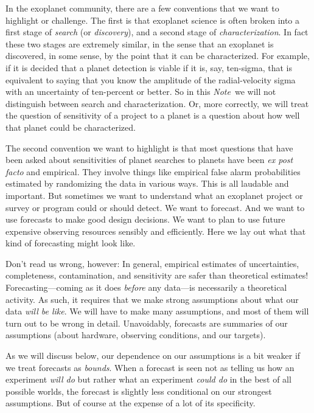 \documentclass[10pt, letterpaper]{article}
\newcommand{\documentname}{\textsl{Note}}
\newcommand{\foreign}[1]{\textsl{#1}}
\newcounter{marginnote}
\renewcommand{\footnote}[1]{\refstepcounter{marginnote}\textsuperscript{\themarginnote}\marginpar{\color{darkgray}\raggedright\footnotesize\textsuperscript{\themarginnote}#1}}
\begin{document}
In the exoplanet community, there are a few conventions that we want
to highlight or challenge.
The first is that exoplanet science is often broken into a first stage
of \textsl{search} (or \textsl{discovery}), and a second stage of
\textsl{characterization}.
In fact these two stages are extremely similar, in the sense that an
exoplanet is discovered, in some sense, by the point that it can be
characterized.
For example, if it is decided that a planet detection is viable if it is,
say, ten-sigma, that is equivalent to saying that you know the amplitude
of the radial-velocity sigma with an uncertainty of ten-percent or better.
So in this \documentname\ we will not distinguish between search and
characterization.
Or, more correctly, we will treat the question of sensitivity of a
project to a planet is a question about how well that planet could be
characterized.

The second convention we want to highlight is that most questions that
have been asked about sensitivities of planet searches to planets have
been \foreign{ex post facto} and empirical.
They involve things like empirical false alarm
probabilities\footnote{MB WHAT TO CITE?}  estimated by randomizing the
data in various ways.
This is all laudable and important.
But sometimes we want to understand what an exoplanet project or survey
or program could or should detect. We want to forecast. And we want to use
forecasts to make good design decisions. We want to plan to use future
expensive observing resources sensibly and efficiently.
Here we lay out what that kind of forecasting might look like.

Don't read us wrong, however: In general, empirical estimates of
uncertainties, completeness, contamination, and sensitivity are safer
than theoretical estimates!
Forecasting---coming as it does \emph{before} any data---is necessarily
a theoretical activity.
As such, it requires that we make strong assumptions about what our data
\emph{will be like}.
We will have to make many assumptions, and most of them will turn out to
be wrong in detail.
Unavoidably, forecasts are summaries of our assumptions (about hardware,
observing conditions, and our targets).

As we will discuss below, our dependence on our assumptions is a bit weaker
if we treat forecasts as \emph{bounds}. When a forecast is seen not as telling
us how an experiment \emph{will do} but rather what an experiment \emph{could do}
in the best of all possible worlds, the forecast is slightly less conditional
on our strongest assumptions. But of course at the  expense of a lot of
its specificity.
\end{document}
